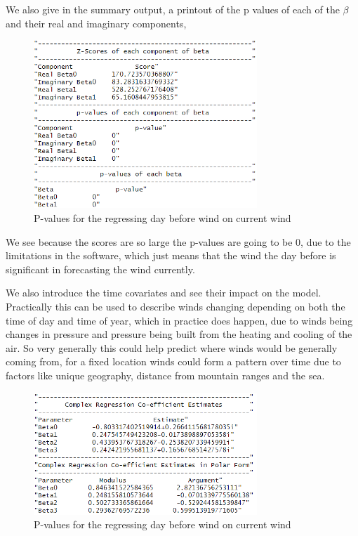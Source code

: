 \documentclass[honours,12pt]{unswthesis}
\numberwithin{equation}{section}
\begin{document}
\noindent We also give in the summary output, a printout of the p values of each of the $\beta$ and their real and imaginary components,

\begin{figure}[h]
	\centering
	\includegraphics[width = 0.75\textwidth]{graphics/pvals}
	\caption{P-values for the regressing day before wind on current wind}
\end{figure}

\noindent We see because the scores are so large the p-values are going to be 0, due to the limitations in the software, which just means that the wind the day before is significant in forecasting the wind currently.\par

We also introduce the time covariates and see their impact on the model. Practically this can be used to describe winds changing depending on both the time of day and time of year, which in practice does happen, due to winds being changes in pressure and pressure being built from the heating and cooling of the air. So very generally this could help predict where winds would be generally coming from, for a fixed location winds could form a pattern over time due to factors like unique geography, distance from mountain ranges and the sea. 

\begin{figure}[h]
	\centering
	\includegraphics[width = 0.75\textwidth]{graphics/extmodelcoef}
	\caption{P-values for the regressing day before wind on current wind}
\end{figure}
\end{document}
